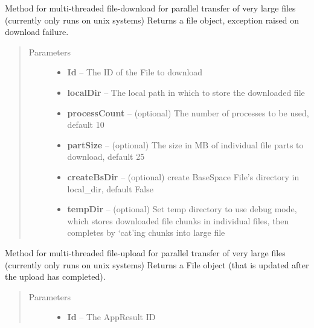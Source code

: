\documentclass[letterpaper,10pt,english]{sphinxmanual}
\begin{document}
\begin{fulllineitems}
\begin{fulllineitems}
\label{Available modules:BaseSpacePy.api.BaseSpaceAPI.BaseSpaceAPI.multipartFileDownload}
Method for multi-threaded file-download for parallel transfer of very large files (currently only runs on unix systems)
Returns a file object, exception raised on download failure.
\begin{quote}\begin{description}
\item[{Parameters}] \leavevmode\begin{itemize}
\item {} 
\textbf{Id} -- The ID of the File to download

\item {} 
\textbf{localDir} -- The local path in which to store the downloaded file

\item {} 
\textbf{processCount} -- (optional) The number of processes to be used, default 10

\item {} 
\textbf{partSize} -- (optional) The size in MB of individual file parts to download, default 25

\item {} 
\textbf{createBsDir} -- (optional) create BaseSpace File's directory in local\_dir, default False

\item {} 
\textbf{tempDir} -- (optional) Set temp directory to use debug mode, which stores downloaded file chunks in individual files, then completes by `cat'ing chunks into large file

\end{itemize}

\end{description}\end{quote}

\end{fulllineitems}


\begin{fulllineitems}
\label{Available modules:BaseSpacePy.api.BaseSpaceAPI.BaseSpaceAPI.multipartFileUpload}
Method for multi-threaded file-upload for parallel transfer of very large files (currently only runs on unix systems)
Returns a File object (that is updated after the upload has completed).
\begin{quote}\begin{description}
\item[{Parameters}] \leavevmode\begin{itemize}
\item {} 
\textbf{Id} -- The AppResult ID


\end{itemize}
\end{description}
\end{quote}
\end{fulllineitems}
\end{fulllineitems}
\end{document}
